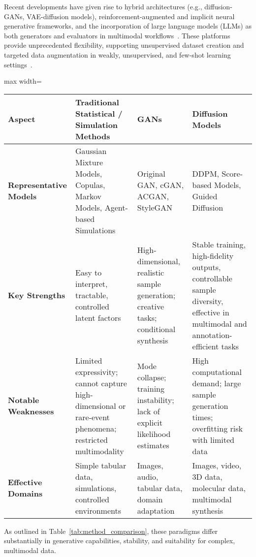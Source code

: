 Recent developments have given rise to hybrid architectures (e.g., diffusion-GANs, VAE-diffusion models), reinforcement-augmented and implicit neural generative frameworks, and the incorporation of large language models (LLMs) as both generators and evaluators in multimodal workflows~\cite{ref2,ref6,ref13,ref16,ref18,ref22,ref23,ref82,ref89,ref90}. These platforms provide unprecedented flexibility, supporting unsupervised dataset creation and targeted data augmentation in weakly, unsupervised, and few-shot learning settings~\cite{ref12,ref23,ref26,ref27,ref64,ref81}.

\begin{table*}[htbp]
\centering
\caption{Comparison of Classical, GAN, and Diffusion Approaches to Synthetic Data Generation}
\label{tab:method_comparison}
\begin{adjustbox}{max width=\textwidth}
\begin{tabular}{llll}
\toprule
\textbf{Aspect} & \textbf{Traditional Statistical / Simulation Methods} & \textbf{GANs} & \textbf{Diffusion Models} \\
\midrule
\textbf{Representative Models} & Gaussian Mixture Models, Copulas, Markov Models, Agent-based Simulations & Original GAN, cGAN, ACGAN, StyleGAN & DDPM, Score-based Models, Guided Diffusion \\
\textbf{Key Strengths} & Easy to interpret, tractable, controlled latent factors & High-dimensional, realistic sample generation; creative tasks; conditional synthesis & Stable training, high-fidelity outputs, controllable sample diversity, effective in multimodal and annotation-efficient tasks \\
\textbf{Notable Weaknesses} & Limited expressivity; cannot capture high-dimensional or rare-event phenomena; restricted multimodality & Mode collapse; training instability; lack of explicit likelihood estimates & High computational demand; large sample generation times; overfitting risk with limited data \\
\textbf{Effective Domains} & Simple tabular data, simulations, controlled environments & Images, audio, tabular data, domain adaptation & Images, video, 3D data, molecular data, multimodal synthesis \\
\bottomrule
\end{tabular}
\end{adjustbox}
\end{table*}

As outlined in Table~\ref{tab:method_comparison}, these paradigms differ substantially in generative capabilities, stability, and suitability for complex, multimodal data.

